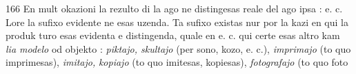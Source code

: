 \begin{VUpage}[170]{166}
En mult okazioni la rezulto di la ago ne distingesas reale\nl
del ago ipsa : \nl
{} e. c. Lore la sufixo  evidente ne esas\nl
uzenda. Ta sufixo existas nur por la kazi en qui la produk\cc
turo esas evidenta e distingenda, quale en \nl
{} e. c. qui certe\nl
esas altro kam \textit{lia modelo} od objekto : \textit{piktajo, skultajo} (per\cc
sono, kozo, e. c.), \textit{imprimajo} (to quo imprimesas), \textit{imitajo,}\nl
\textit{kopiajo} (to quo imitesas, kopiesas), \textit{fotografajo} (to quo foto\cc
\end{VUpage}

